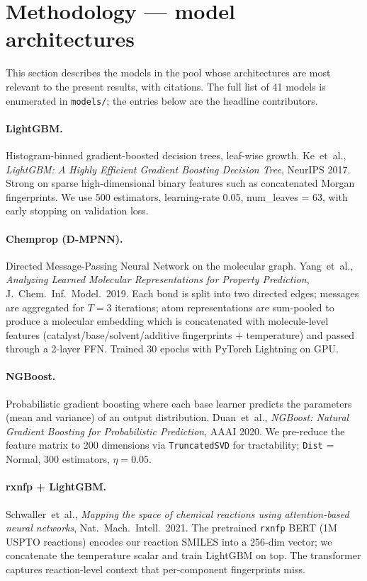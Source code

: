 \documentclass[11pt,a4paper]{article}
\begin{document}
\section{Methodology — model architectures}\label{sec:methodology}

This section describes the models in the pool whose architectures are most
relevant to the present results, with citations. The full list of 41 models
is enumerated in \texttt{models/}; the entries below are the headline
contributors.

\paragraph{LightGBM.}
Histogram-binned gradient-boosted decision trees, leaf-wise growth.
Ke~et~al., \emph{LightGBM: A Highly Efficient Gradient Boosting Decision
Tree}, NeurIPS 2017. Strong on sparse high-dimensional binary features such
as concatenated Morgan fingerprints. We use 500 estimators, learning-rate
0.05, num\_leaves = 63, with early stopping on validation loss.

\paragraph{Chemprop (D-MPNN).}
Directed Message-Passing Neural Network on the molecular graph.
Yang~et~al., \emph{Analyzing Learned Molecular Representations for Property
Prediction}, J.\ Chem.\ Inf.\ Model.\ 2019. Each bond is split into two
directed edges; messages are aggregated for $T = 3$ iterations; atom
representations are sum-pooled to produce a molecular embedding which is
concatenated with molecule-level features (catalyst/base/solvent/additive
fingerprints + temperature) and passed through a 2-layer FFN.
Trained 30 epochs with PyTorch Lightning on GPU.

\paragraph{NGBoost.}
Probabilistic gradient boosting where each base learner predicts the
parameters (mean and variance) of an output distribution. Duan~et~al.,
\emph{NGBoost: Natural Gradient Boosting for Probabilistic Prediction},
AAAI 2020. We pre-reduce the feature matrix to 200 dimensions via
\texttt{TruncatedSVD} for tractability; \texttt{Dist} = Normal,
$300$ estimators, $\eta = 0.05$.

\paragraph{rxnfp + LightGBM.}
Schwaller~et~al., \emph{Mapping the space of chemical reactions using
attention-based neural networks}, Nat.\ Mach.\ Intell.\ 2021. The pretrained
\texttt{rxnfp} BERT (1M USPTO reactions) encodes our reaction SMILES into a
256-dim vector; we concatenate the temperature scalar and train LightGBM on
top. The transformer captures reaction-level context that per-component
fingerprints miss.
\end{document}
